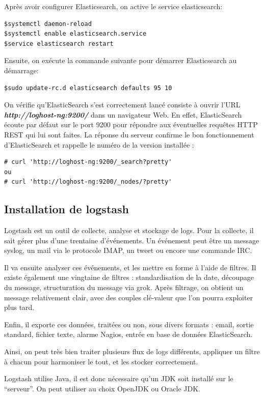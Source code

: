 \documentclass[11pt,a4paper]{article}
\begin{document}
Après avoir configurer Elasticsearch, on active le service elasticsearch:

\begin{verbatim}
$systemctl daemon-reload
$systemctl enable elasticsearch.service
$service elasticsearch restart
\end{verbatim}

Ensuite, on exécute la commande suivante pour démarrer Elasticsearch au démarrage:

\begin{verbatim}
$sudo update-rc.d elasticsearch defaults 95 10
\end{verbatim}

On vérifie qu'ElasticSearch s'est correctement lancé consiste à ouvrir l'URL\textit{ \textbf{http://loghost-ng:9200/}} dans un navigateur Web. En effet, ElasticSearch écoute par défaut sur le port 9200 pour répondre aux éventuelles requêtes HTTP REST qui lui sont faites.
La réponse du serveur confirme le bon fonctionnement d'ElasticSearch et rappelle le numéro de la version installée :
\begin{verbatim}
# curl 'http://loghost-ng:9200/_search?pretty'
ou
# curl 'http://loghost-ng:9200/_nodes/?pretty'
\end{verbatim}

\subsection{Installation de logstash}
Logstash est un outil de collecte, analyse et stockage de logs. Pour la collecte, il sait gérer plus d'une trentaine d'événements. Un événement peut être un message syslog, un mail via le protocole IMAP, un tweet ou encore une commande IRC.

Il va ensuite analyser ces événements, et les mettre en forme à l'aide de filtres. Il existe également une vingtaine de filtres : standardisation de la date, découpage du message, structuration du message via grok.
Après filtrage, on obtient un message relativement clair, avec des couples clé-valeur que l'on pourra exploiter plus tard.

Enfin, il exporte ces données, traitées ou non, sous divers formats : email, sortie standard, fichier texte, alarme Nagios, entrée en base de données ElasticSearch.

Ainsi, on peut très bien traiter plusieurs flux de logs différents, appliquer un filtre à chacun pour harmoniser le tout, et les stocker correctement.

Logstash utilise Java, il est donc nécessaire qu’un JDK soit installé sur le “serveur”. On peut utiliser au choix OpenJDK ou Oracle JDK.
\end{document}
